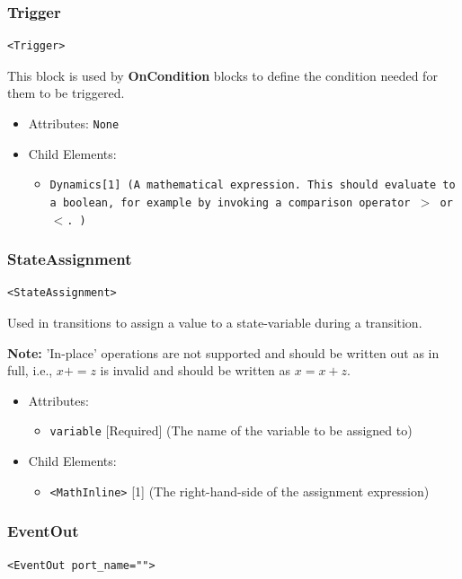 \documentclass{article}
\newcommand{\note}[1]{%
\begin{center}
\colorbox{issuecolor}{\parbox{0.8\linewidth}{\textbf{Note:} #1}}
\end{center}%
}
\newcommand{\MathInline}{\tt{Dynamics}}
\newcommand{\OnCondition}{{\bf{OnCondition}}\xspace}
\begin{document}
\subsubsection{Trigger}
%
\begin{lstlisting}
<Trigger>
\end{lstlisting}

This block is used by \OnCondition blocks to define the condition needed for them to be triggered. 

\begin{itemize}
\item Attributes: \texttt{None}

\item Child Elements:
%
\begin{itemize}
\item \MathInline {[}1{]} (A mathematical expression. This should evaluate to a
boolean, for example by invoking a comparison operator  $>$ or $<$. )
\end{itemize}
\end{itemize}

\subsubsection{StateAssignment}
%
\begin{lstlisting}
<StateAssignment>
\end{lstlisting}

Used in transitions to assign a value to a state-variable during a transition.

\note{'In-place' operations are not supported and should be written out as in full,
i.e., $x+=z$ is invalid and should be written as $x=x+z$.}

\begin{itemize}
\item Attributes:
%
\begin{itemize}
\item \verb|variable| {[}Required{]} (The name of the variable to be assigned to)
\end{itemize}

\item Child Elements:
%
\begin{itemize}
\item \verb|<MathInline>| {[}1{]} (The right-hand-side of the assignment expression)
\end{itemize}
\end{itemize}

\subsubsection{EventOut}
%
\begin{lstlisting}
<EventOut port_name="">
\end{lstlisting}
\end{document}
